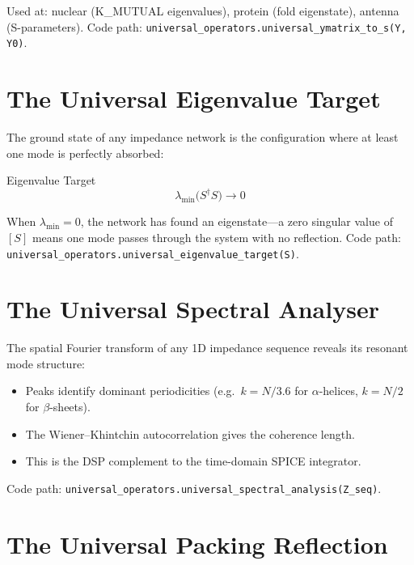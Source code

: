 Used at: nuclear (K\_MUTUAL eigenvalues), protein (fold eigenstate),
antenna (S-parameters).
Code path: \texttt{universal\_operators.universal\_ymatrix\_to\_s(Y, Y0)}.

\section{The Universal Eigenvalue Target}
\label{sec:universal_eigenvalue}

The ground state of any impedance network is the configuration where
at least one mode is perfectly absorbed:
\begin{resultbox}{Eigenvalue Target}
\begin{equation}
    \lambda_\text{min}\bigl(S^\dagger S\bigr) \to 0
    \label{eq:eigenvalue_target}
\end{equation}
\end{resultbox}

When $\lambda_\text{min} = 0$, the network has found an eigenstate---a
zero singular value of $[S]$ means one mode passes through the system
with no reflection.  Code path: \texttt{universal\_operators.universal\_eigenvalue\_target(S)}.

\section{The Universal Spectral Analyser}
\label{sec:universal_spectral}

The spatial Fourier transform of any 1D impedance sequence reveals
its resonant mode structure:
\begin{itemize}
    \item Peaks identify dominant periodicities
      (e.g.\ $k = N/3.6$ for $\alpha$-helices, $k = N/2$ for $\beta$-sheets).
    \item The Wiener--Khintchin autocorrelation gives the coherence length.
    \item This is the DSP complement to the time-domain SPICE integrator.
\end{itemize}

Code path: \texttt{universal\_operators.universal\_spectral\_analysis(Z\_seq)}.

\section{The Universal Packing Reflection}
\label{sec:universal_packing}

